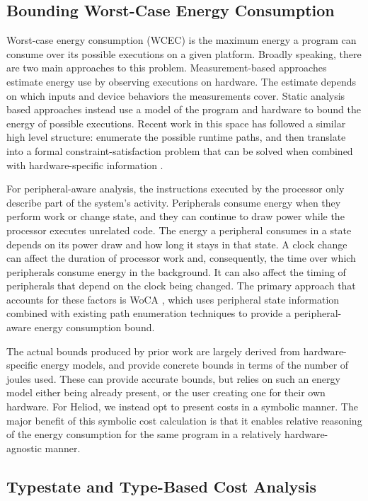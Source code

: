 \subsection{Bounding Worst-Case Energy Consumption}

Worst-case energy consumption (WCEC) is the maximum energy a program can consume over its possible executions on a given platform. Broadly speaking, there are two main approaches to this problem. Measurement-based approaches estimate energy use by observing executions on hardware. The estimate depends on which inputs and device behaviors the measurements cover. Static analysis based approaches instead use a model of the program and hardware to bound the energy of possible executions. Recent work in this space has followed a similar high level structure: enumerate the possible runtime paths, and then translate into a formal constraint-satisfaction problem that can be solved when combined with hardware-specific information \cite{raffeck_et_al_OASIcs_WCET_2019_4,wegener_et_al_OASIcs_WCET_2023_9}.

For peripheral-aware analysis, the instructions executed by the processor only describe part of the system's activity. Peripherals consume energy when they perform work or change state, and they can continue to draw power while the processor executes unrelated code. The energy a peripheral consumes in a state depends on its power draw and how long it stays in that state. A clock change can affect the duration of processor work and, consequently, the time over which peripherals consume energy in the background. It can also affect the timing of peripherals that depend on the clock being changed. The primary approach that accounts for these factors is WoCA \cite{woca}, which uses peripheral state information combined with existing path enumeration techniques to provide a peripheral-aware energy consumption bound.

The actual bounds produced by prior work are largely derived from hardware-specific energy models, and provide concrete bounds in terms of the number of joules used. These can provide accurate bounds, but relies on such an energy model either being already present, or the user creating one for their own hardware. For Heliod, we instead opt to present costs in a symbolic manner. The major benefit of this symbolic cost calculation is that it enables relative reasoning of the energy consumption for the same program in a relatively hardware-agnostic manner. 

\subsection{Typestate and Type-Based Cost Analysis}

